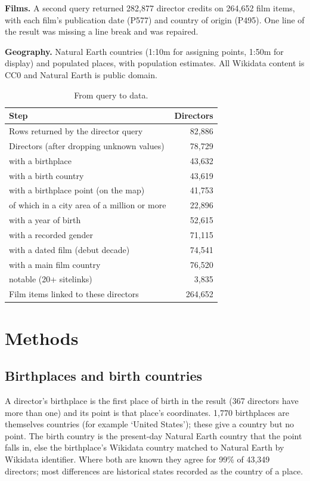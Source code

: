 \documentclass[11pt,a4paper]{article}
\begin{document}
\textbf{Films.} A second query returned 282,877 director credits on 264,652 film items, with each film's publication date (P577) and country of origin (P495). One line of the result was missing a line break and was repaired.

\textbf{Geography.} Natural Earth \citep{naturalearth} countries (1:10m for assigning points, 1:50m for display) and populated places, with population estimates. All Wikidata content is CC0 and Natural Earth is public domain.

\begin{table}[tbp]\centering\small\caption{From query to data.}\label{tab:pipe}\begin{tabular}{p{10cm}r}\toprule Step & Directors\\\midrule
Rows returned by the director query & 82,886\\
Directors (after dropping unknown values) & 78,729\\
\quad with a birthplace & 43,632\\
\quad with a birth country & 43,619\\
\quad with a birthplace point (on the map) & 41,753\\
\quad\quad of which in a city area of a million or more & 22,896\\
\quad with a year of birth & 52,615\\
\quad with a recorded gender & 71,115\\
\quad with a dated film (debut decade) & 74,541\\
\quad with a main film country & 76,520\\
\quad notable (20+ sitelinks) & 3,835\\
Film items linked to these directors & 264,652\\
\bottomrule\end{tabular}\end{table}

\section{Methods}
\subsection{Birthplaces and birth countries}
A director's birthplace is the first place of birth in the result (367 directors have more than one) and its point is that place's coordinates. 1,770 birthplaces are themselves countries (for example `United States'); these give a country but no point. The birth country is the present-day Natural Earth country that the point falls in, else the birthplace's Wikidata country matched to Natural Earth by Wikidata identifier. Where both are known they agree for 99\% of 43,349 directors; most differences are historical states recorded as the country of a place.
\end{document}
